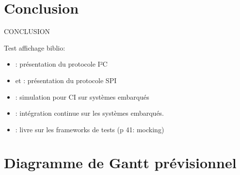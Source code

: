 \documentclass[a4paper]{article}
\begin{document}
\clearpage

\section*{Conclusion}

CONCLUSION



Test affichage biblio:

\begin{itemize}
  \item \cite{mankar2014review}: présentation du protocole I²C
  \item \cite{dhaker2018introduction} et \cite{li2014design}: présentation du
    protocole SPI
  \item \cite{engblom2015continuous}: simulation pour CI sur systèmes embarqués
  \item \cite{maartensson2016continuous}: intégration continue sur les systèmes
    embarqués.
  \item \cite{hamill2004unit}: livre sur les frameworks de tests (p 41: mocking)
\end{itemize}

\clearpage{}
\pagestyle{empty}
\printbibliography[keyword={paper},title={Biliographie}]
\printbibliography[keyword={web},title={Webographie}]

\clearpage
\printglossaries

\appendix

\clearpage{}
\section{Diagramme de Gantt prévisionnel}\label{appendix:expectedgantt}
\end{document}
